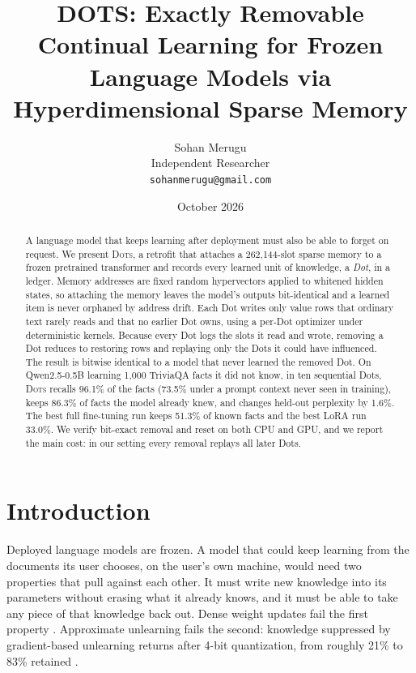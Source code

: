 \documentclass[11pt]{article}
\title{DOTS: Exactly Removable Continual Learning for Frozen\\Language Models via Hyperdimensional Sparse Memory}
\author{Sohan Merugu\\
Independent Researcher\\
\texttt{sohanmerugu@gmail.com}}
\date{October 2026}
\newcommand{\sys}{\textsc{Dots}}
\begin{document}
\maketitle

\begin{abstract}
A language model that keeps learning after deployment must also be able to forget on request. We present \sys{}, a retrofit that attaches a 262{,}144-slot sparse memory to a frozen pretrained transformer and records every learned unit of knowledge, a \emph{Dot}, in a ledger. Memory addresses are fixed random hypervectors applied to whitened hidden states, so attaching the memory leaves the model's outputs bit-identical and a learned item is never orphaned by address drift. Each Dot writes only value rows that ordinary text rarely reads and that no earlier Dot owns, using a per-Dot optimizer under deterministic kernels. Because every Dot logs the slots it read and wrote, removing a Dot reduces to restoring rows and replaying only the Dots it could have influenced. The result is bitwise identical to a model that never learned the removed Dot. On Qwen2.5-0.5B learning 1{,}000 TriviaQA facts it did not know, in ten sequential Dots, \sys{} recalls 96.1\% of the facts (73.5\% under a prompt context never seen in training), keeps 86.3\% of facts the model already knew, and changes held-out perplexity by 1.6\%. The best full fine-tuning run keeps 51.3\% of known facts and the best LoRA run 33.0\%. We verify bit-exact removal and reset on both CPU and GPU, and we report the main cost: in our setting every removal replays all later Dots.
\end{abstract}

\section{Introduction}

Deployed language models are frozen. A model that could keep learning from the documents its user chooses, on the user's own machine, would need two properties that pull against each other. It must write new knowledge into its parameters without erasing what it already knows, and it must be able to take any piece of that knowledge back out. Dense weight updates fail the first property \citep{mccloskey1989,kirkpatrick2017ewc,ibrahim2024simple}. Approximate unlearning fails the second: knowledge suppressed by gradient-based unlearning returns after 4-bit quantization, from roughly 21\% to 83\% retained \citep{zhang2025quant}.
\end{document}
